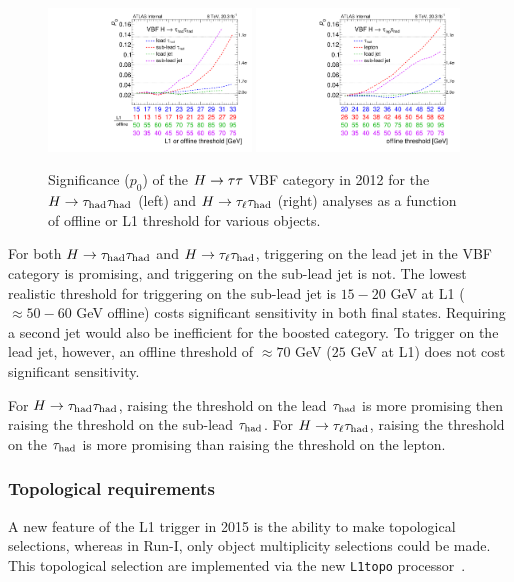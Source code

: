 \begin{figure}[!htpb]
  \centering
  \includegraphics[width=0.48\textwidth]{figures/trigger/evolution_hadhad}
  \includegraphics[width=0.48\textwidth]{figures/trigger/evolution_lephad}
  \caption{Significance ($p_0$) of the $H\rightarrow\tau\tau$ VBF category in 2012 for the $H\rightarrow\tau_\text{had}\tau_\text{had}$ (left) and $H\rightarrow\tau_\ell\tau_\text{had}$ (right) analyses as a function of offline or L1 threshold for various objects.}
  \label{fig:prospects-trigger-evolution}
\end{figure}

For both $H\rightarrow\tau_\text{had}\tau_\text{had}$ and $H\rightarrow\tau_\ell\tau_\text{had}$, triggering on the lead jet in the VBF category is promising, and triggering on the sub-lead jet is not. The lowest realistic threshold for triggering on the sub-lead jet is $15-20$ GeV at L1 ($\approx\! 50-60$ GeV offline) costs significant sensitivity in both final states. Requiring a second jet would also be inefficient for the boosted category. To trigger on the lead jet, however, an offline threshold of $\approx\! 70$ GeV ($25$ GeV at L1) does not cost significant sensitivity.

For $H\rightarrow\tau_\text{had}\tau_\text{had}$, raising the threshold on the lead $\tau_\text{had}$ is more promising then raising the threshold on the sub-lead $\tau_\text{had}$. For $H\rightarrow\tau_\ell\tau_\text{had}$, raising the threshold on the $\tau_\text{had}$ is more promising than raising the threshold on the lepton.

\subsubsection{Topological requirements}

A new feature of the L1 trigger in 2015 is the ability to make topological selections, whereas in Run-I, only object multiplicity selections could be made. This topological selection are implemented via the new \texttt{L1topo} processor~\cite{ATL-DAQ-PROC-2013-039,ATL-COM-DAQ-2014-005}.

